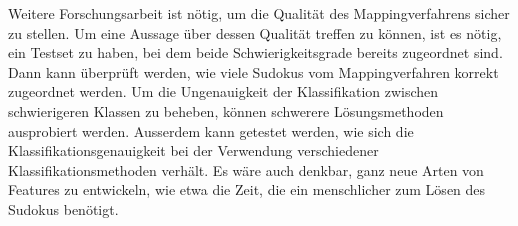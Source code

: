 Weitere Forschungsarbeit ist nötig, um die Qualität des Mappingverfahrens sicher zu stellen. Um eine Aussage über dessen Qualität treffen zu können, ist es nötig, ein Testset zu haben, bei dem beide Schwierigkeitsgrade bereits zugeordnet sind. Dann kann überprüft werden, wie viele Sudokus vom Mappingverfahren korrekt zugeordnet werden. Um die Ungenauigkeit der Klassifikation zwischen schwierigeren Klassen zu beheben, können schwerere Lösungsmethoden ausprobiert werden. Ausserdem kann getestet werden, wie sich die Klassifikationsgenauigkeit bei der Verwendung verschiedener Klassifikationsmethoden verhält. Es wäre auch denkbar, ganz neue Arten von Features zu entwickeln, wie etwa die Zeit, die ein menschlicher zum Lösen des Sudokus benötigt.